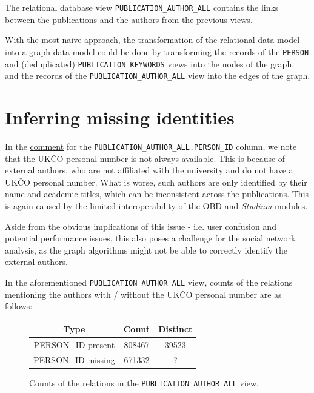 The relational database view \texttt{PUBLICATION\_AUTHOR\_ALL} contains the links between the publications and the authors from the previous views.

With the most naive approach, the transformation of the relational data model into a graph data model could be done by transforming the records of the 
\texttt{PERSON} and (deduplicated) \texttt{PUBLICATION\_KEYWORDS} views into the nodes of the graph, 
and the records of the \texttt{PUBLICATION\_AUTHOR\_ALL} view into the edges of the graph.

\section{Inferring missing identities}\label{sec:inferring-missing-identities}

    In the \hyperref[sec:pub-author-all]{comment} for the \texttt{PUBLICATION\_AUTHOR\_ALL.PERSON\_ID} column, we note that the \ac{UKČO} personal number is not always available.
    This is because of external authors, who are not affiliated with the university and do not have a \ac{UKČO} personal number.
What is worse, such authors are only identified by their name and academic titles, which can be inconsistent across the publications.
This is again caused by the limited interoperability of the \ac{OBD} and \textit{Studium} modules.

Aside from the obvious implications of this issue - i.e. user confusion and potential performance issues,
this also poses a challenge for the social network analysis, as the graph algorithms might not be able 
to correctly identify the external authors.

    In the aforementioned \texttt{PUBLICATION\_AUTHOR\_ALL} view, counts of the relations mentioning the authors with / without the \ac{UKČO} personal number are as follows:

\begin{figure}[!ht]
    \captionsetup{width=.9\linewidth}
    \centering
    \begin{tabular}{|c|c|c|}
    \hline
        Type & Count & Distinct \\ \hline
        PERSON\_ID present & 808467 & 39523 \\ \hline
        PERSON\_ID missing & 671332 & ? \\ \hline
    \end{tabular}
    \caption{Counts of the relations in the \texttt{PUBLICATION\_AUTHOR\_ALL} view.}
\end{figure}

